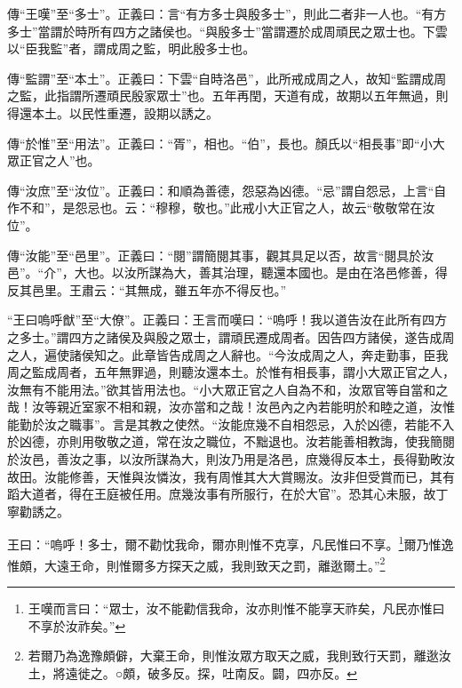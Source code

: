 {\noindent\zhuan{}\fzbyks 傳“王嘆”至“多士”。正義曰：言“有方多士與殷多士”，則此二者非一人也。“有方多士”當謂於時所有四方之諸侯也。“與殷多士”當謂遷於成周頑民之眾士也。下雲以“臣我監”者，謂成周之監，明此殷多士也。 \par}

{\noindent\zhuan{}\fzbyks 傳“監謂”至“本土”。正義曰：下雲“自時洛邑”，此所戒成周之人，故知“監謂成周之監，此指謂所遷頑民殷家眾士”也。五年再閏，天道有成，故期以五年無過，則得還本土。以民性重遷，設期以誘之。 \par}

{\noindent\zhuan{}\fzbyks 傳“於惟”至“用法”。正義曰：“胥”，相也。“伯”，長也。顏氏以“相長事”即“小大眾正官之人”也。 \par}

{\noindent\zhuan{}\fzbyks 傳“汝庶”至“汝位”。正義曰：和順為善德，怨惡為凶德。“忌”謂自怨忌，上言“自作不和”，是怨忌也。云：“穆穆，敬也。”此戒小大正官之人，故云“敬敬常在汝位”。 \par}

{\noindent\zhuan{}\fzbyks 傳“汝能”至“邑里”。正義曰：“閱”謂簡閱其事，觀其具足以否，故言“閱具於汝邑”。“介”，大也。以汝所謀為大，善其治理，聽還本國也。是由在洛邑修善，得反其邑里。王肅云：“其無成，雖五年亦不得反也。” \par}

{\noindent\shu{}\fzkt “王曰嗚呼猷”至“大僚”。正義曰：王言而嘆曰：“嗚呼！我以道告汝在此所有四方之多士。”謂四方之諸侯及與殷之眾士，謂頑民遷成周者。因告四方諸侯，遂告成周之人，遍使諸侯知之。此章皆告成周之人辭也。“今汝成周之人，奔走勤事，臣我周之監成周者，五年無罪過，則聽汝還本土。於惟有相長事，謂小大眾正官之人，汝無有不能用法。”欲其皆用法也。“小大眾正官之人自為不和，汝眾官等自當和之哉！汝等親近室家不相和親，汝亦當和之哉！汝邑內之內若能明於和睦之道，汝惟能勤於汝之職事”。言是其教之使然。“汝能庶幾不自相怨忌，入於凶德，若能不入於凶德，亦則用敬敬之道，常在汝之職位，不黜退也。汝若能善相教誨，使我簡閱於汝邑，善汝之事，以汝所謀為大，則汝乃用是洛邑，庶幾得反本土，長得勤畋汝故田。汝能修善，天惟與汝憐汝，我有周惟其大大賞賜汝。汝非但受賞而已，其有蹈大道者，得在王庭被任用。庶幾汝事有所服行，在於大官”。恐其心未服，故丁寧勸誘之。 \par}

王曰：“嗚呼！多士，爾不勸忱我命，爾亦則惟不克享，凡民惟曰不享。\footnote{王嘆而言曰：“眾士，汝不能勸信我命，汝亦則惟不能享天祚矣，凡民亦惟曰不享於汝祚矣。”}爾乃惟逸惟頗，大遠王命，則惟爾多方探天之威，我則致天之罰，離逖爾土。”\footnote{若爾乃為逸豫頗僻，大棄王命，則惟汝眾方取天之威，我則致行天罰，離逖汝土，將遠徙之。○頗，破多反。探，吐南反。闢，四亦反。}


